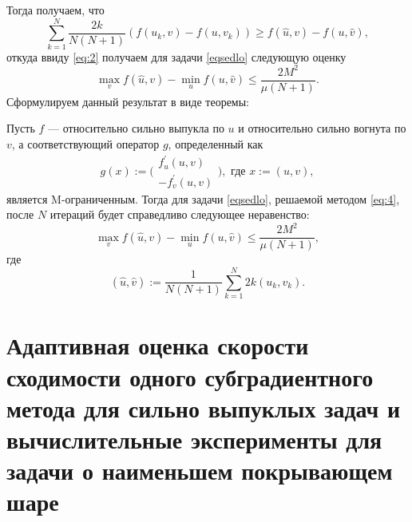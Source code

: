     Тогда получаем, что
    \begin{equation}
        \sum_{k=1}^{N} \frac{2k}{N(N+1)} (f(u_k, v) - f(u, v_k)) \geq f(\widehat{u}, v) - f(u, \widehat{v}), 
    \end{equation}
    откуда ввиду \eqref{eq:2} получаем для задачи \eqref{eqsedlo} следующую оценку
    \begin{equation}
        \max_{v} f(\widehat{u}, v) - \min_{u} f(u, \widehat{v}) \leq \frac{2M^2}{\mu (N+1)}.
    \end{equation}
    Сформулируем данный результат в виде теоремы:
    \begin{theorem}
        Пусть $f$ --- относительно сильно выпукла по $u$ и относительно сильно вогнута по $v$, а соответствующий оператор $g$, определенный как
        \[
            g(x) := \Bigg( 
                \begin{aligned}
                    f^{'}_{u}(u,v)\\
                    -f^{'}_{v}(u,v)
                \end{aligned}
            \Bigg), \text{ где } x := (u, v),
        \]
        является M-ограниченным. Тогда для задачи \eqref{eqsedlo}, решаемой методом \eqref{eq:4}, после $N$ итераций будет справедливо следующее неравенство:
        \begin{equation}
            \max_{v} f(\widehat{u}, v) - \min_{u} f(u, \widehat{v}) \leq \frac{2M^2}{\mu (N+1)},
        \end{equation}
        где
        \[
            (\widehat{u}, \widehat{v}) := \frac{1}{N(N+1)} \sum_{k=1}^{N} 2k (u_k,v_k).
        \]
    \end{theorem}

\section{Адаптивная оценка скорости сходимости одного субградиентного метода для сильно выпуклых задач и вычислительные эксперименты для задачи о наименьшем покрывающем шаре}  \label{sec:ch2/sec4}

